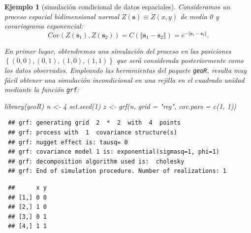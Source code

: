 \documentclass[
]{book}
\newenvironment{Shaded}{\begin{snugshade}}{\end{snugshade}}
\newcommand{\AttributeTok}[1]{\textcolor[rgb]{0.77,0.63,0.00}{#1}}
\newcommand{\CommentTok}[1]{\textcolor[rgb]{0.56,0.35,0.01}{\textit{#1}}}
\newcommand{\DecValTok}[1]{\textcolor[rgb]{0.00,0.00,0.81}{#1}}
\newcommand{\FunctionTok}[1]{\textcolor[rgb]{0.00,0.00,0.00}{#1}}
\newcommand{\NormalTok}[1]{#1}
\newcommand{\OtherTok}[1]{\textcolor[rgb]{0.56,0.35,0.01}{#1}}
\newcommand{\SpecialCharTok}[1]{\textcolor[rgb]{0.00,0.00,0.00}{#1}}
\newcommand{\StringTok}[1]{\textcolor[rgb]{0.31,0.60,0.02}{#1}}
\theoremstyle{break}
\newtheorem{example}{Ejemplo}[chapter]
\theoremstyle{nonumberplain}
\renewcommand{\CommentTok}[1]{\textcolor[rgb]{0.41,0.41,0.41}{\texttt{#1}}}
\begin{document}
\begin{example}[simulación condicional de datos espaciales]

Consideramos un proceso espacial bidimensional normal
\(Z(\mathbf{s})\equiv Z(x,y)\) de media 0 y covariograma
exponencial:
\[Cov(Z(\mathbf{s}_1),Z(\mathbf{s}_2)) 
= C(\left\Vert \mathbf{s}_1-\mathbf{s}_2\right\Vert )
= e^{-\left\Vert \mathbf{s}_1-\mathbf{s}_2\right\Vert }.\]

En primer lugar, obtendremos una simulación del proceso en las posiciones
\(\left\{(0,0),(0,1),(1,0),(1,1)\right\}\) que será considerada posteriormente
como los datos observados.
Empleando las herramientas del paquete \texttt{geoR}, resulta muy fácil obtener
una simulación incondicional en una rejilla en el cuadrado unidad
mediante la función \texttt{grf}:

\begin{Shaded}
\begin{Highlighting}[]
\FunctionTok{library}\NormalTok{(geoR)}
\NormalTok{n }\OtherTok{\textless{}{-}} \DecValTok{4}
\FunctionTok{set.seed}\NormalTok{(}\DecValTok{1}\NormalTok{)}
\NormalTok{z }\OtherTok{\textless{}{-}} \FunctionTok{grf}\NormalTok{(n, }\AttributeTok{grid =} \StringTok{"reg"}\NormalTok{, }\AttributeTok{cov.pars =} \FunctionTok{c}\NormalTok{(}\DecValTok{1}\NormalTok{, }\DecValTok{1}\NormalTok{))}
\end{Highlighting}
\end{Shaded}

\begin{verbatim}
 ## grf: generating grid  2  *  2  with  4  points
 ## grf: process with  1  covariance structure(s)
 ## grf: nugget effect is: tausq= 0 
 ## grf: covariance model 1 is: exponential(sigmasq=1, phi=1)
 ## grf: decomposition algorithm used is:  cholesky 
 ## grf: End of simulation procedure. Number of realizations: 1
\end{verbatim}

\begin{Shaded}
\end{Shaded}

\begin{verbatim}
 ##      x y
 ## [1,] 0 0
 ## [2,] 1 0
 ## [3,] 0 1
 ## [4,] 1 1
\end{verbatim}

\begin{Shaded}
\end{Shaded}


\end{example}
\end{document}
